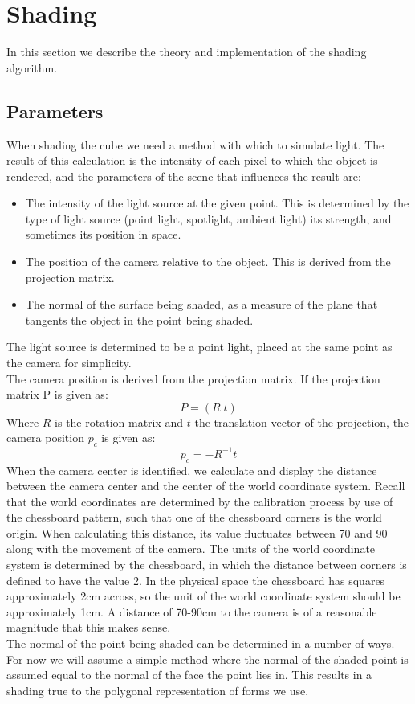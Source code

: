 \section{Shading}
In this section we describe the theory and implementation of the shading algorithm.

\subsection{Parameters}

When shading the cube we need a method with which to simulate light. The result of this calculation is the intensity of each pixel to which the object is rendered, and the parameters of the scene that influences the result are:
\begin{itemize}
	\item The intensity of the light source at the given point. This is determined by the type of light source (point light, spotlight, ambient light) its strength, and sometimes its position in space.
	\item The position of the camera relative to the object. This is derived from the projection matrix. 
	\item The normal of the surface being shaded, as a measure of the plane that tangents the object in the point being shaded. 
\end{itemize}

The light source is determined to be a point light, placed at the same point as the camera for simplicity.\\
The camera position is derived from the projection matrix. If the projection matrix P is given as:
\begin{equation}
	P = (R|t)
\end{equation}
Where $R$ is the rotation matrix and $t$ the translation vector of the projection, the camera position $p_c$ is given as:
\begin{equation}
	p_c = -R^{-1} t
\end{equation}
When the camera center is identified, we calculate and display the distance between the camera center and the center of the world coordinate system. Recall that the world coordinates are determined by the calibration process by use of the chessboard pattern, such that one of the chessboard corners is the world origin. When calculating this distance, its value fluctuates between 70 and 90 along with the movement of the camera. The units of the world coordinate system is determined by the chessboard, in which the distance between corners is defined to have the value 2. In the physical space the chessboard has squares approximately 2cm across, so the unit of the world coordinate system should be approximately 1cm. A distance of 70-90cm to the camera is of a reasonable magnitude that this makes sense.\\
The normal of the point being shaded can be determined in a number of ways. For now we will assume a simple method where the normal of the shaded point is assumed equal to the normal of the face the point lies in. This results in a shading true to the polygonal representation of forms we use.\\

